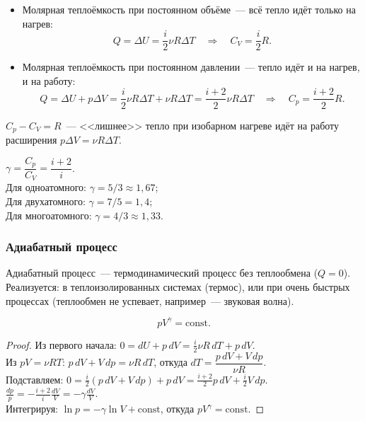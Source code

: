 \documentclass[12pt]{article}
\begin{document}
\begin{itemize}
	\item Молярная теплоёмкость при постоянном объёме~--- всё тепло идёт только на нагрев:
	\[
		Q = \Delta U = \frac{i}{2}\nu R\Delta T \quad \Longrightarrow \quad C_V = \frac{i}{2}R.
	\]
	\item Молярная теплоёмкость при постоянном давлении~--- тепло идёт и на нагрев, и на работу:
	\[
		Q = \Delta U + p\Delta V = \frac{i}{2}\nu R\Delta T + \nu R\Delta T = \frac{i+2}{2}\nu R\Delta T \quad \Longrightarrow \quad C_p = \frac{i+2}{2}R.
	\]
\end{itemize}

\begin{definition}
	$C_p - C_V = R$~--- <<лишнее>> тепло при изобарном нагреве идёт на работу расширения $p\Delta V = \nu R\Delta T$.
\end{definition}

\begin{definition}
	$\gamma = \dfrac{C_p}{C_V} = \dfrac{i+2}{i}$.\\
	Для одноатомного: $\gamma = 5/3 \approx 1{,}67$;\\
	Для двухатомного: $\gamma = 7/5 = 1{,}4$;\\
	Для многоатомного: $\gamma = 4/3 \approx 1{,}33$.
\end{definition}

\subsubsection{Адиабатный процесс}

\begin{definition}
	Адиабатный процесс~--- термодинамический процесс без теплообмена ($Q = 0$). Реализуется: в теплоизолированных системах (термос), или при очень быстрых процессах (теплообмен не успевает, например~--- звуковая волна).
\end{definition}

\begin{statement}
	\[
		pV^\gamma = \text{const}.
	\]
\end{statement}
\begin{proof}
	Из первого начала: $0 = dU + p\,dV = \frac{i}{2}\nu R\,dT + p\,dV$.\\
	Из $pV = \nu RT$: $p\,dV + V\,dp = \nu R\,dT$, откуда $dT = \dfrac{p\,dV + V\,dp}{\nu R}$.\\
	Подставляем: $0 = \frac{i}{2}(p\,dV + V\,dp) + p\,dV = \frac{i+2}{2}p\,dV + \frac{i}{2}V\,dp$.\\
	$\frac{dp}{p} = -\frac{i+2}{i}\frac{dV}{V} = -\gamma\frac{dV}{V}$.\\
	Интегрируя: $\ln p = -\gamma \ln V + \text{const}$, откуда $pV^\gamma = \text{const}$.
\end{proof}
\end{document}

